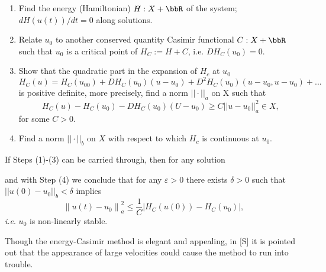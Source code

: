 \begin{enumerate}
  \item Find the energy (Hamiltonian) $H :X + \bbR$ of the system; $d H ( u ( t ) )/dt = 0$ along 
  solutions. 
  \item Relate $u_0$ to another conserved quantity Casimir functional $C : X + \bbR$ such that $u_0$ is a critical point of $H_C := H + C$, i.e. $DH_C(u_0) = 0$. 
  \item Show that the quadratic part in the expansion of $H_c$ at $u_0$ 
  $$H_C(u) = H_C(u_00) + DH_C(u_0)(u - u_0) + D^2H_C(u_0)(u - u_0, u - u_0) + ... $$
  is positive definite, more precisely, find a norm $|| \cdot ||_a $ on X such that 
  $$H_C(u) - H_C(u_0) - DH_C(u_0)(U - u_0) \geq  C||u-u_0||^2_a \in X,$$ 
  for some $C > 0$. 
  \item Find a norm $||\cdot ||_b$ on $X$ with respect to which $H_c$ is continuous at $u_0$. 
\end{enumerate}


If Steps (1)-(3) can be carried through, then for any solution 

and with Step (4) we conclude that for any $\varepsilon > 0$ there exists $\delta > 0$ such that $||u(0)-u_0||_b < \delta$ implies  $$\left\|u(t)-u_{0}\right\|^{2}_a \leqslant \frac{1}{C}\left|H_{C}(u(0))-H_{C}\left(u_{0}\right)\right| ,$$ \textit{i.e}. $u_0$ is non-linearly stable. 

Though the energy-Casimir method is elegant and appealing, in [S] 
it is pointed out that the appearance of large velocities could cause the method to run into trouble.
